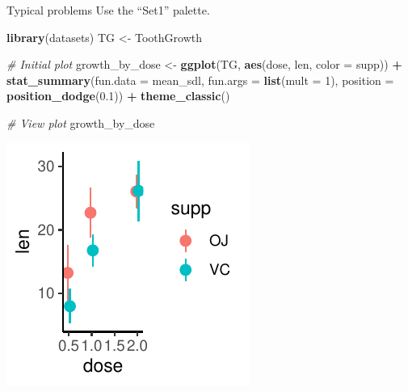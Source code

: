 \documentclass[
  ignorenonframetext,
]{beamer}
\newenvironment{Shaded}{\begin{snugshade}}{\end{snugshade}}
\newcommand{\AttributeTok}[1]{\textcolor[rgb]{0.13,0.29,0.53}{#1}}
\newcommand{\CommentTok}[1]{\textcolor[rgb]{0.56,0.35,0.01}{\textit{#1}}}
\newcommand{\DecValTok}[1]{\textcolor[rgb]{0.00,0.00,0.81}{#1}}
\newcommand{\FloatTok}[1]{\textcolor[rgb]{0.00,0.00,0.81}{#1}}
\newcommand{\FunctionTok}[1]{\textcolor[rgb]{0.13,0.29,0.53}{\textbf{#1}}}
\newcommand{\NormalTok}[1]{#1}
\newcommand{\OtherTok}[1]{\textcolor[rgb]{0.56,0.35,0.01}{#1}}
\newcommand{\SpecialCharTok}[1]{\textcolor[rgb]{0.81,0.36,0.00}{\textbf{#1}}}
\begin{document}
\begin{frame}[fragile]{Typical problems}
\label{typical-problems-8}
Use the ``Set1'' palette.


\begin{Shaded}
\begin{Highlighting}[]
\FunctionTok{library}\NormalTok{(datasets)}
\NormalTok{TG }\OtherTok{\textless{}{-}}\NormalTok{ ToothGrowth}

\CommentTok{\# Initial plot}
\NormalTok{growth\_by\_dose }\OtherTok{\textless{}{-}} \FunctionTok{ggplot}\NormalTok{(TG, }\FunctionTok{aes}\NormalTok{(dose, len, }\AttributeTok{color =}\NormalTok{ supp)) }\SpecialCharTok{+}
    \FunctionTok{stat\_summary}\NormalTok{(}\AttributeTok{fun.data =}\NormalTok{ mean\_sdl, }\AttributeTok{fun.args =} \FunctionTok{list}\NormalTok{(}\AttributeTok{mult =} \DecValTok{1}\NormalTok{),}
        \AttributeTok{position =} \FunctionTok{position\_dodge}\NormalTok{(}\FloatTok{0.1}\NormalTok{)) }\SpecialCharTok{+} \FunctionTok{theme\_classic}\NormalTok{()}

\CommentTok{\# View plot}
\NormalTok{growth\_by\_dose}
\end{Highlighting}
\end{Shaded}

\begin{center}\includegraphics[width=0.5\linewidth]{Figs/unnamed-chunk-123-1} \end{center}
\end{frame}
\end{document}
